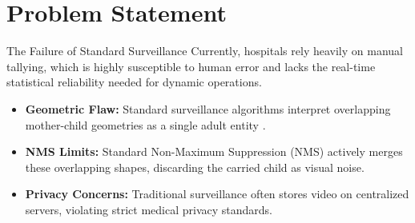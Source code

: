 \section{Problem Statement}

\begin{frame}{The Failure of Standard Surveillance}
    Currently, hospitals rely heavily on manual tallying, which is highly susceptible to human error and lacks the real-time statistical reliability needed for dynamic operations.
    \begin{itemize}
        \item \textbf{Geometric Flaw:} Standard surveillance algorithms interpret overlapping mother-child geometries as a single adult entity \parencite{ouyang2015}.
        \item \textbf{NMS Limits:} Standard Non-Maximum Suppression (NMS) actively merges these overlapping shapes, discarding the carried child as visual noise.
        \item \textbf{Privacy Concerns:} Traditional surveillance often stores video on centralized servers, violating strict medical privacy standards.
    \end{itemize}
\end{frame}
